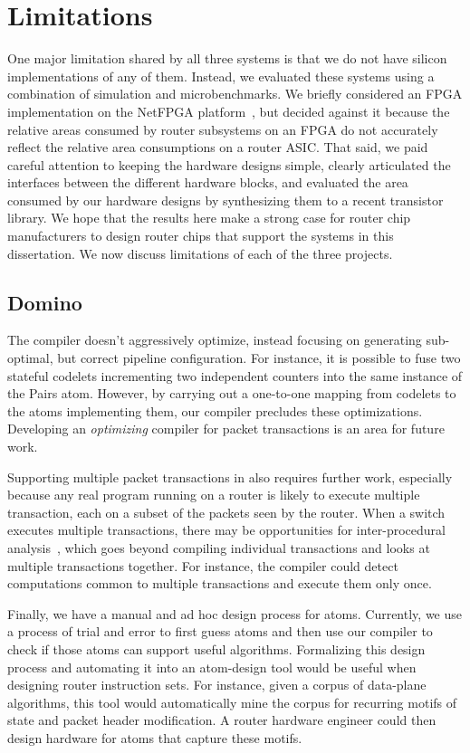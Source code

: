 \chapter{Limitations}
\label{chap:limitations}

One major limitation shared by all three systems is that we do not have silicon
implementations of any of them. Instead, we evaluated these systems using a
combination of simulation and microbenchmarks. We briefly considered an FPGA
implementation on the NetFPGA platform~\cite{netfpga}, but decided against it
because the relative areas consumed by router subsystems on an FPGA do not
accurately reflect the relative area consumptions on a router ASIC.  That said,
we paid careful attention to keeping the hardware designs simple, clearly
articulated the interfaces between the different hardware blocks, and evaluated
the area consumed by our hardware designs by synthesizing them to a recent
transistor library. We hope that the results here make a strong case for router
chip manufacturers to design router chips that support the systems in this
dissertation. We now discuss limitations of each of the three projects.

\section{Domino}
\label{sec:domino_limitations}
The \pktlanguage compiler doesn't aggressively optimize, instead focusing on
generating sub-optimal, but correct pipeline configuration. For instance, it is
possible to fuse two stateful codelets incrementing two independent counters
into the same instance of the Pairs atom. However, by carrying out a one-to-one
mapping from codelets to the atoms implementing them, our compiler precludes
these optimizations.  Developing an {\em optimizing} compiler for packet
transactions is an area for future work.

Supporting multiple packet transactions in \pktlanguage also requires further
work, especially because any real program running on a router is likely to
execute multiple transaction, each on a subset of the packets seen by the
router. When a switch executes multiple transactions, there may be
opportunities for inter-procedural analysis~\cite{dragonbook}, which goes
beyond compiling individual transactions and looks at multiple transactions
together.  For instance, the compiler could detect computations common to
multiple transactions and execute them only once.

Finally, we have a manual and ad hoc design process for atoms. Currently, we
use a process of trial and error to first guess atoms and then use our compiler
to check if those atoms can support useful algorithms.  Formalizing this design
process and automating it into an atom-design tool would be useful when
designing router instruction sets. For instance, given a corpus of data-plane
algorithms, this tool would automatically mine the corpus for recurring motifs
of state and packet header modification. A router hardware engineer could then
design hardware for atoms that capture these motifs.

